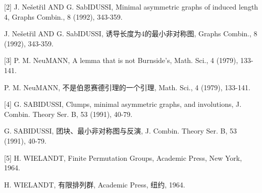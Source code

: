 \documentclass[10pt]{article}
\begin{document}
[2] J. Nešetřil AND G. SabIDUSSI, Minimal asymmetric graphs of induced length 4, Graphs Combin., 8 (1992), 343-359.

\begin{tcolorbox}\relax
[2] J. Nešetřil AND G. SabIDUSSI, 诱导长度为4的最小非对称图, Graphs Combin., 8 (1992), 343-359.
\end{tcolorbox}

[3] P. M. NeuMANN, A lemma that is not Burnside's, Math. Sci., 4 (1979), 133-141.

\begin{tcolorbox}\relax
[3] P. M. NeuMANN, 不是伯恩赛德引理的一个引理, Math. Sci., 4 (1979), 133-141.
\end{tcolorbox}

[4] G. SABIDUSSI, Clumps, minimal asymmetric graphs, and involutions, J. Combin. Theory Ser. B, 53 (1991), 40-79.

\begin{tcolorbox}\relax
[4] G. SABIDUSSI, 团块、最小非对称图与反演, J. Combin. Theory Ser. B, 53 (1991), 40-79.
\end{tcolorbox}

[5] H. WIELANDT, Finite Permutation Groups, Academic Press, New York, 1964.

\begin{tcolorbox}\relax
[5] H. WIELANDT, 有限排列群, Academic Press, 纽约, 1964.
\end{tcolorbox}
\end{document}
